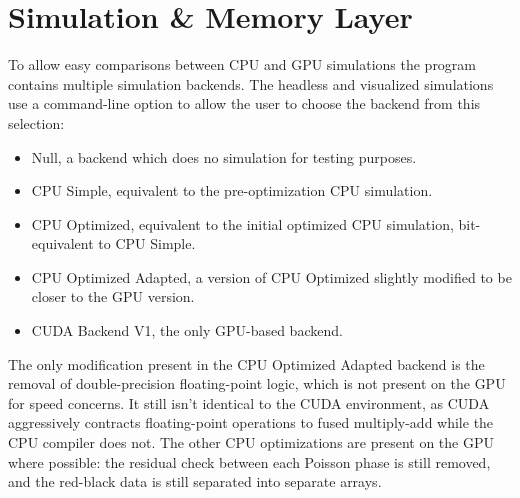 \section{Simulation \& Memory Layer}

To allow easy comparisons between CPU and GPU simulations the program contains multiple simulation backends.
The headless and visualized simulations use a  command-line option to allow the user to choose the backend from this selection:\label{sec:DesignBackends}
\begin{itemize}
    \item Null, a backend which does no simulation for testing purposes.
    \item CPU Simple, equivalent to the pre-optimization CPU simulation.
    \item CPU Optimized, equivalent to the initial optimized CPU simulation, bit-equivalent to CPU Simple.
    \item CPU Optimized Adapted, a version of CPU Optimized slightly modified to be closer to the GPU version.
    \item CUDA Backend V1, the only GPU-based backend.
\end{itemize}

The only modification present in the CPU Optimized Adapted backend is the removal of double-precision floating-point logic, which is not present on the GPU for speed concerns.
It still isn't identical to the CUDA environment, as CUDA aggressively contracts floating-point operations to fused multiply-add while the CPU compiler does not.
The other CPU optimizations are present on the GPU where possible: the residual check between each Poisson phase is still removed, and the red-black data is still separated into separate arrays. 


